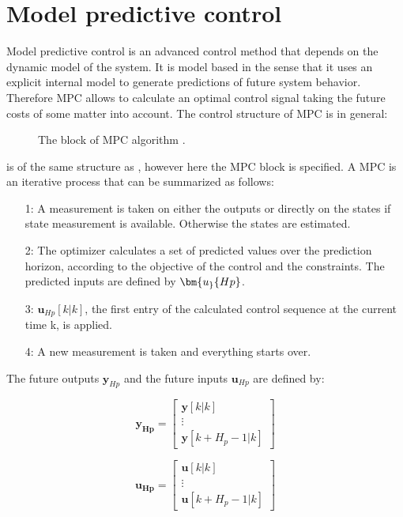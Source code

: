 \section{Model predictive control}
\label{sec:MPC}

Model predictive control is an advanced control method that depends on the dynamic model of the system. It is model based in the sense that it uses an explicit internal model to generate predictions of future system behavior. Therefore MPC allows to calculate an optimal control signal taking the future costs of some matter into account. The control structure of MPC is in general:

\begin{figure}[H]
\centering
 
\caption{The block of MPC algorithm \cite{Camacho2007}.}
\label{mpc_structure}
\end{figure}

 is of the same structure as , however here the MPC block is specified. A MPC is an iterative process that can be summarized as follows: 

\begin{itemize}
\item[1:] A measurement is taken on either the outputs or directly on the states if state measurement is available. Otherwise the states are estimated. 
\item[2:] The optimizer calculates a set of predicted values over the prediction horizon, according to the objective of the control and the constraints. The predicted inputs are defined by $\bm{u_}{Hp}$.
\item[3:] $\bm{u}_{Hp}[k|k]$, the first entry of the calculated control sequence at the current time k, is applied.
\item[4:] A new measurement is taken and everything starts over. 
\end{itemize}

The future outputs $\bm{y}_{Hp}$ and the future inputs $\bm{u}_{Hp}$ are defined by:

\begin{equation}
\bm{y_{Hp}} =  
 \begin{bmatrix}
  \bm{y}[k|k]\\
  \vdots  \\
  \bm{y}[k+H_p-1|k]   
 \end{bmatrix}
\end{equation}

\begin{equation}
\bm{u_{Hp}} =  
 \begin{bmatrix}
  \bm{u}[k|k]\\
  \vdots  \\
  \bm{u}[k+H_p-1|k]   
 \end{bmatrix}
\end{equation}

